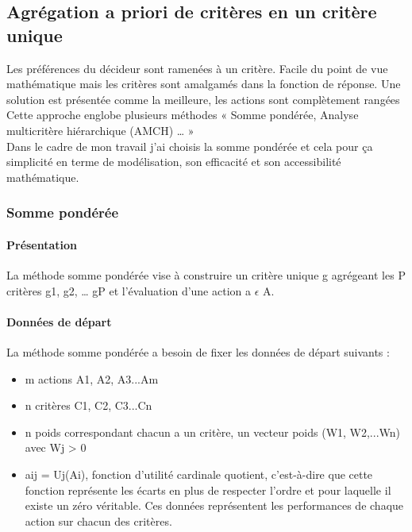 \subsection{Agrégation a priori de critères en un critère unique}
Les préférences du décideur sont ramenées à un critère. Facile du point de vue mathématique mais les critères sont amalgamés dans la fonction de réponse. Une solution est présentée comme la meilleure, les actions sont complètement rangées\\
Cette approche englobe plusieurs méthodes « Somme pondérée, Analyse multicritère hiérarchique (AMCH) … »\\
Dans le cadre de mon travail j’ai choisis la somme pondérée et cela pour ça simplicité en terme de modélisation, son efficacité et son accessibilité mathématique.\\


\subsubsection{Somme pondérée}


\setcounter{secnumdepth}{4}


\paragraph{Présentation}
La méthode somme pondérée vise à construire un critère unique g agrégeant les P critères g1, g2, … gP et l’évaluation d’une action a $\epsilon$ A.

\paragraph{Données de départ}
La méthode somme pondérée a besoin de fixer les données de départ suivants :  
\begin{itemize}
\item m actions A1, A2, A3...Am
\item n critères C1, C2, C3...Cn
\item n poids correspondant chacun a un critère, un vecteur poids (W1, W2,...Wn) avec Wj > 0
\item aij = Uj(Ai), fonction d'utilité cardinale quotient, c'est-à-dire que cette fonction représente les écarts en plus de respecter l'ordre et pour laquelle il existe un zéro véritable. Ces données représentent les performances de chaque action sur chacun des critères.
\end{itemize}

